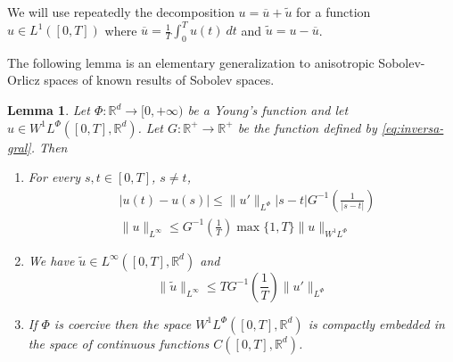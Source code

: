 \documentclass[twoside]{article}
\newtheorem{lem}[thm]{Lemma}
\theoremstyle{remark}
\newcommand{\orlnor}{\|_{L^{\Phi}}}
\newcommand{\linf}{\|_{L^{\infty}}}
\newcommand{\lphi}{L^{\Phi}}
\newcommand{\wphi}{W^{1}\lphi}
\newcommand{\sobnor}{\|_{W^{1}\lphi}}
\newcommand{\rr}{\mathbb{R}}
\renewcommand{\leq}{\leqslant}
\newcounter{example}
\begin{document}
%
%
 We will use repeatedly the decomposition $u=\overline{u}+\widetilde{u}$ for a function $u\in L^1([0,T])$  where $\overline{u} =\frac1T\int_0^T u(t)\ dt$ and $\widetilde{u}=u-\overline{u}$.

 The following lemma is an elementary generalization to anisotropic Sobolev-Orlicz spaces of known results of Sobolev spaces.


%
%
%
%
%
%
%
%
%
%


\begin{lem}\label{inclusion orlicz} Let $\Phi:\rr^d\to [0,+\infty)$ be a Young's 
function and let $u\in\wphi([0,T],\rr^d)$. Let 
$G: \rr^+ \to \rr^+$ be the function defined by \eqref{eq:inversa-gral}. Then
\begin{enumerate}
\item\label{inclusion orlicz_item1} For every $s,t\in [0,T]$, $s\neq t$,
\begin{align}
 &|u(t)-u(s)| \leq
 \|u'\orlnor |s-t|G^{-1}\left(\frac{1}{|s-t|}\right)\tag{Morrey's inequality}\label{in-sob-cont}
\\
& \| u\linf \leq G^{-1}\left(\frac{1}{T}\right)\max\{1,T\}\|u\sobnor\tag{Sobolev's inequality}\label{sobolev}
\end{align}
\item We have $\widetilde{u}\in L^{\infty}([0,T],\rr^d)$ and
\[
\|\widetilde u \linf \leq T G^{-1}\left(\frac{1}{T}\right)\|u'\orlnor
\tag{Sobolev-Wirtinger's inequality}\label{wirtinger}
\]
\item\label{it:embeding} If $\Phi$ is coercive then the space $\wphi([0,T],\rr^d)$ is compactly embedded in the space of continuous functions $C([0,T],\rr^d)$.
\end{enumerate}
\end{lem}
\end{document}
